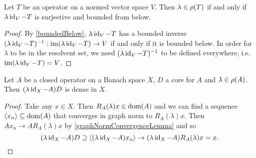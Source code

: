 \begin{lemma} \label{elementResolventSetNormedSpace}
Let $T$ be an operator on a normed vector space $V$. Then $\lambda \in \rho(T)$ \textup{if and only if} $\lambda \operatorname{id}_V - T$ is surjective and bounded from below.
\end{lemma}
\begin{proof}
By \ref{boundedBelow}, $\lambda \operatorname{id}_V - T$ has a bounded inverse $(\lambda \operatorname{id}_V - T)^{-1}: \operatorname{im}(\lambda \operatorname{id}_V - T)\to V$ if and only if it is bounded below. In order for $\lambda$ to be in the resolvent set, we need $(\lambda \operatorname{id}_V - T)^{-1}$ to be defined everywhere, i.e. $\operatorname{im}(\lambda \operatorname{id}_V - T) = V$.
\end{proof}

\begin{lemma} \label{densityCoreLemma}
Let $A$ be a closed operator on a Banach space $X$, $D$ a core for $A$ and $\lambda\in\rho(A)$. Then $(\lambda\operatorname{id}_X - A)D$ is dense in $X$.
\end{lemma}
\begin{proof}
Take any $x\in X$. Then $R_A(\lambda)x\in \operatorname{dom}(A)$ and we can find a sequence $\left\langle x_n \right\rangle\subseteq \operatorname{dom}(A)$ that converges in graph norm to $R_A(\lambda)x$. Then $Ax_n \to AR_A(\lambda)x$ by \ref{graphNormConvergenceLemma} and so
\[ (\lambda\operatorname{id}_X - A)D \supseteq \left\langle (\lambda\operatorname{id}_X - A)x_n \right\rangle \to (\lambda\operatorname{id}_X - A)R_A(\lambda)x = x. \]
\end{proof}

